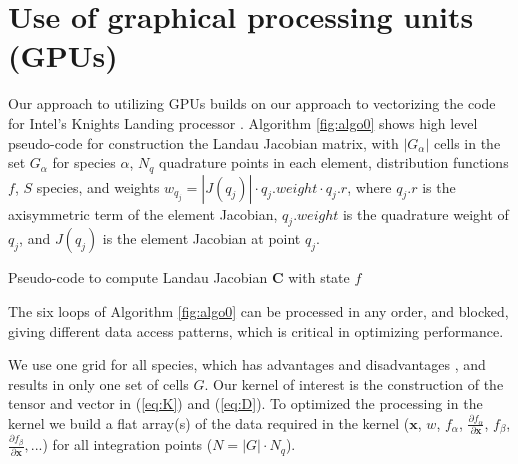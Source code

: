 \documentclass[12pt]{siamart}
\begin{document}
\section{Use of graphical processing units (GPUs)}

Our approach to utilizing GPUs builds on our approach to vectorizing the code for Intel's Knights Landing processor \cite{AdamsHirvijokiKnepleyBrownIsaacMills2017}.
Algorithm \ref{fig:algo0} shows high level pseudo-code for construction the
Landau Jacobian matrix, with $|G_\alpha|$ cells in the set $G_\alpha$ for species $\alpha$, $N_q$
quadrature points in each element, distribution functions $f$, $S$
species, and weights $w_{q_j} = |J\left(q_j\right)| \cdot q_j.weight
\cdot q_j.r$, where $q_j.r$ is the axisymmetric term of the element
Jacobian, $q_j.weight$ is the quadrature weight of $q_j$, and
$J\left(q_j\right)$ is the element Jacobian at point $q_j$.
\begin{algorithm}[h!]
\begin{algorithmic}[100]
\ENDFOR
\ENDFOR
\ENDFOR
\ENDFOR
\ENDFOR
\ENDFOR
\end{algorithmic} 
\caption{Pseudo-code to compute Landau Jacobian $\mathbf{C}$ with state $f$}
\label{fig:algo0}
\end{algorithm}
The six loops of Algorithm \ref{fig:algo0} can be processed in any
order, and blocked, giving different data access patterns, which is
critical in optimizing performance.

We use one grid for all species, which has advantages and disadvantages \cite{AdamsHirvijokiKnepleyBrownIsaacMills2017}, and results in only one set of cells $G$.
Our kernel of interest is the construction of the tensor and vector in (\ref{eq:K}) and (\ref{eq:D}).
To optimized the processing in the kernel we build a flat array(s) of the data required in the kernel ($\bm x$, $w$, $f_{\alpha}$,  $\frac{\partial f_{\alpha}}{\partial \bm x}$,  $f_{\beta}$,  $\frac{\partial f_{\beta}}{\partial \bm x}, ... $) for all integration points ($N = | G | \cdot N_q$).
\end{document}
